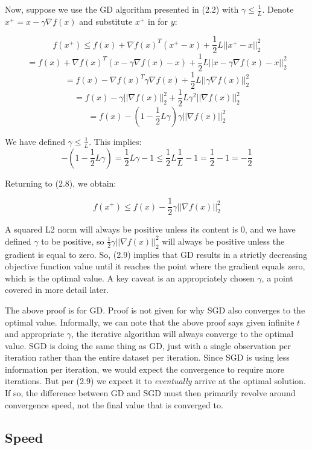 \documentclass{report}
\begin{document}
Now, suppose we use the GD algorithm presented in (2.2) with $\gamma \leq
\frac{1}{L}$. Denote $x^+ = x - \gamma \nabla
f(x)$ and substitute $x^+$ in for $y$:

$$ f(x^+) \leq f(x) + \nabla f(x)^T(x^+ - x) + \frac{1}{2}L||x^+ - x||_2^2 $$
$$ = f(x) + \nabla f(x)^T(x - \gamma \nabla f(x) - x) + \frac{1}{2}L||x - \gamma \nabla f(x) - x||_2^2 $$
$$ = f(x) - \nabla f(x)^T \gamma \nabla f(x)  + \frac{1}{2}L||\gamma \nabla f(x)||_2^2 $$
$$ = f(x) - \gamma||\nabla f(x)||_2^2 + \frac{1}{2} L \gamma^2||\nabla f(x)||_2^2$$
\begin{equation}
= f(x) - (1 - \frac{1}{2}L\gamma)\gamma||\nabla f(x)||_2^2 
\end{equation}

We have defined $\gamma \leq \frac{1}{L}$. This implies:
$$
-(1 - \frac{1}{2}L \gamma) = \frac{1}{2}L \gamma - 1
\leq \frac{1}{2}L\frac{1}{L} - 1
= \frac{1}{2} - 1
= - \frac{1}{2}
$$

Returning to (2.8), we obtain:

\begin{equation}
f(x^+) \leq f(x) - \frac{1}{2}\gamma||\nabla f(x)||_2^2
\end{equation}

A squared L2 norm will always be positive unless its content is
0, and we have defined $\gamma$ to be positive, so $\frac{1}{2} \gamma||\nabla f(x)||_2^2$ will always be positive unless the
gradient is equal to zero. So, (2.9) implies that GD results in a strictly
decreasing objective function value until it reaches the point where the
gradient equals zero, which is the optimal value. A key caveat is an
appropriately chosen $\gamma$, a point covered in more detail later.

The above proof is for GD. Proof is not given for why SGD also
converges to the optimal value. Informally, we can note that the above proof
says given infinite $t$ and appropriate $\gamma$, the iterative algorithm will
always converge to the optimal value. SGD is doing the same thing as GD, 
just with a single observation per iteration 
rather than the entire dataset per iteration. Since SGD is using less information
per iteration, we would expect the convergence to require more iterations. But
per (2.9) we expect it to \textit{eventually} arrive at the optimal solution.
If so, the difference between GD and SGD must then primarily revolve
around convergence speed, not the final value that is converged to.

\subsection{Speed}
\end{document}
